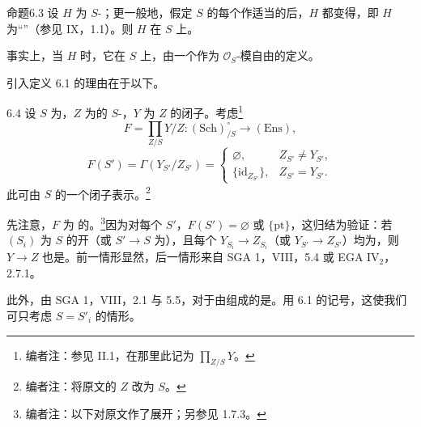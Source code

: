 \begin{SGAresult}{命题}{6.3}
设 $H$ 为 $S$-；更一般地，假定 $S$ 的每个作适当的后，$H$ 都变得，即 $H$ 为“”（参见 IX，1.1）。则 $H$ 在 $S$ 上。
\end{SGAresult}
事实上，当 $H$ 时，它在 $S$ 上，由一个作为 $\mathcal O_S$-模自由的定义。

引入定义 6.1 的理由在于以下。
\begin{SGAresult}{}{6.4}
设 $S$ 为，$Z$ 为的 $S$-，$Y$ 为 $Z$ 的闭子。考虑\footnote[24]{编者注：参见 II.1，在那里此记为 $\prod_{Z/S}Y$。}
\[
F=\prod_{Z/S}Y/Z:(\mathrm{Sch})_{/S}^{\circ}\longrightarrow(\mathrm{Ens}),
\]
\[
F(S')=\Gamma(Y_{S'}/Z_{S'})=
\begin{cases}
\varnothing,&Z_{S'}\ne Y_{S'},\\
\{\mathrm{id}_{Z_{S'}}\},&Z_{S'}=Y_{S'}.
\end{cases}
\]
此可由 $S$ 的一个闭子表示。\footnote[25]{编者注：将原文的 $Z$ 改为 $S$。}
\end{SGAresult}
先注意，$F$ 为 的。\footnote[26]{编者注：以下对原文作了展开；另参见 1.7.3。}因为对每个 $S'$，$F(S')=\varnothing$ 或 $\{\mathrm{pt}\}$，这归结为验证：若 $(S_i)$ 为 $S$ 的开（或 $S'\to S$ 为），且每个 $Y_{S_i}\to Z_{S_i}$（或 $Y_{S'}\to Z_{S'}$）均为，则 $Y\to Z$ 也是。前一情形显然，后一情形来自 SGA 1，VIII，5.4 或 EGA IV$_2$，2.7.1。

此外，由 SGA 1，VIII，2.1 与 5.5，对于由组成的是。用 6.1 的记号，这使我们可只考虑 $S=S'_i$ 的情形。

